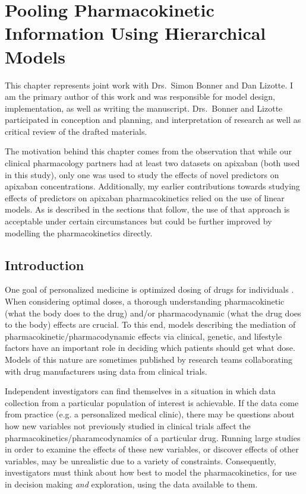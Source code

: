 \chapter{Pooling Pharmacokinetic Information Using Hierarchical Models}


This chapter represents joint work with Drs.\ Simon Bonner and Dan Lizotte.  I am the primary author of this work and was responsible for model design, implementation, as well as writing the manuscript.  Drs.\ Bonner and Lizotte participated in conception and planning, and interpretation of research as well as critical review of the drafted materials.

The motivation behind this chapter comes from the observation that while our clinical pharmacology partners had at least two datasets on apixaban (both used in this study), only one was used to study the effects of novel predictors on apixaban concentrations.  Additionally, my earlier contributions towards studying effects of predictors on apixaban pharmacokinetics relied on the use of linear models.  As is described in the sections that follow, the use of that approach is acceptable under certain circumstances but could be further improved by modelling the pharmacokinetics directly. 

\section{Introduction}

One goal of personalized medicine is optimized dosing of drugs for individuals \cite{morse2015personalized}.  When considering optimal doses, a thorough understanding pharmacokinetic (what the body does to the drug) and/or pharmacodynamic (what the drug does to the body) effects are crucial.  To this end, models describing the mediation of pharmacokinetic/pharmacodynamic effects via clinical, genetic, and lifestyle factors have an important role in deciding which patients should get what dose. Models of this nature are sometimes published by research teams collaborating with drug manufacturers using data from clinical trials.

Independent investigators can find themselves in a situation in which data collection from a particular population of interest is achievable. If the data come from practice (e.g. a personalized medical clinic), there may be questions about how new variables not previously studied in clinical trials affect the pharmacokinetics/pharamcodynamics of a particular drug.  Running large studies in order to examine the effects of these new variables, or discover effects of other variables, may be unrealistic due to a variety of constraints.  Consequently, investigators must think about how best to model the pharmacokinetics, for use in decision making \textit{and} exploration, using the data available to them.

